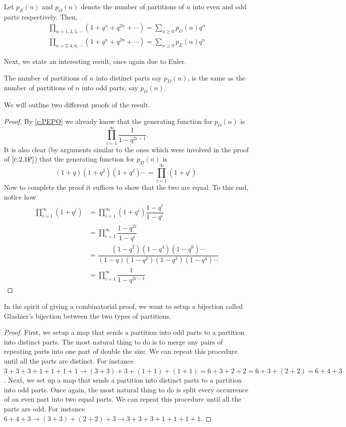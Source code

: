 \begin{claim}
    Let $p_E(n)$ and $p_O(n)$ denote the number of partitions of $n$ into even and odd parts respectively. Then,
    \begin{align*}
    \prod_{n=1,3,5,\cdots}(1+q^n+q^{2n}+\cdots)=\sum_{n\geq 0}p_O(n)q^n \\
    \prod_{n=2,4,6,\cdots}(1+q^n+q^{2n}+\cdots)=\sum_{n\geq 0}p_E(n)q^n 
    \end{align*}
    \label{c:PEPO}
\end{claim}
Next, we state an interesting result, once again due to Euler.
\begin{theorem}
The number of partitions of $n$ into distinct parts say $p_D(n)$, is the same as the number of partitions of $n$ into odd parts, say $p_O(n)$.
\label{t:Euler'sGem}
\end{theorem}
We will outline two different proofs of the result.
\begin{proof}
By \cref{c:PEPO} we already know that the generating function for $p_O(n)$ is 
\[
\prod_{i=1}^{\infty}\dfrac{1}{1-q^{2i-1}}.
\]
It is also clear (by arguments similar to the ones which were involved in the proof of $\cref{c:2.1P}$) that the generating function for $p_D(n)$ is 
\[
(1+q)(1+q^2)(1+q^3)\cdots = \prod_{i=1}^\infty(1+q^i).
\]
Now to complete the proof it suffices to show that the two are equal. To this end, notice how 
\begin{align*}
    \prod_{i=1}^\infty(1+q^i) &= \prod_{i=1}^\infty (1+q^i)\dfrac{1-q^i}{1-q^i} \\
    &= \prod_{i=1}^\infty \dfrac{1-q^{2i}}{1-q^i} \\\
    &= \dfrac{(1-q^2)(1-q^4)(1-q^6)\cdots}{(1-q)(1-q^2)(1-q^3)(1-q^4)\cdots} \\
    &= \prod_{i=1}^\infty \dfrac{1}{1-q^{2i-1}}
\end{align*}
\end{proof}
In the spirit of giving a combinatorial proof, we want to setup a bijection called Glashier's bijection between the two types of partitions.
\begin{proof}
First, we setup a map that sends a partition into odd parts to a partition into distinct parts. The most natural thing to do is to merge any pairs of repeating parts into one part of double the size. We can repeat this procedure until all the parts are distinct. For instance $3+3+3+1+1+1+1\to (3+3)+3+(1+1)+(1+1)= 6+3+2+2 = 6+3+(2+2) = 6+4+3$. Next, we set up a map that sends a partition into distinct parts to a partition into odd parts. Once again, the most natural thing to do is split every occurrence of an even part into two equal parts. We can repeat this procedure until all the parts are odd. For instance $6+4+3\to (3+3)+(2+2)+3\to 3+3+3+1+1+1+1$.
\end{proof}
